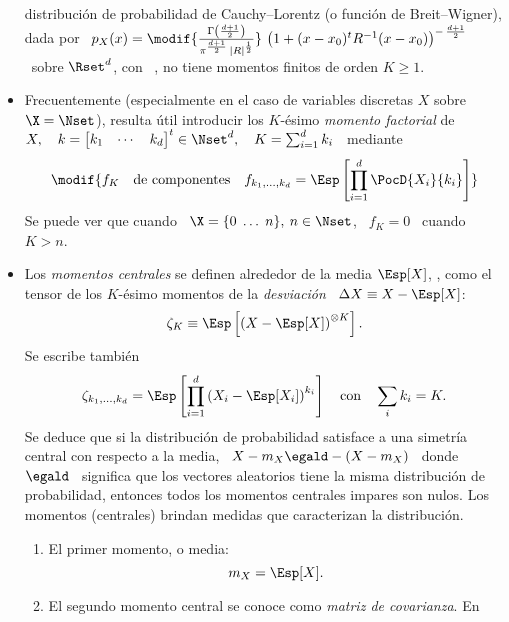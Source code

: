 \begin{itemize}
  distribuci\'on   de   probabilidad   de   Cauchy--Lorentz  (o   funci\'on   de
  Breit--Wigner), dada  por \ $p_X(x)  = \modif{\frac{\Gamma\left( \frac{d+1}{2}
      \right)}{\pi^{\frac{d+1}{2}} \, \left| R \right|^{\frac12}}} \, \left( 1 +
    (x-x_0)^t R^{-1}  (x-x_0) \right)^{-  \, \frac{d+1}{2}}$ \  sobre $\Rset^d$,
  con  \ , no  tiene momentos
  finitos de orden $K \geq 1$.
%
\item Frecuentemente (especialmente en el  caso de variables discretas $X$ sobre
  $\X  =  \Nset$),  resulta   \'util  introducir  los  $K$-\'esimo  {\it  momento
    factorial}   de   $X,  \quad   k   =   \begin{bmatrix}   k_1  &   \cdots   &
    k_d \end{bmatrix}^t \in \Nset^d, \quad K = \sum_{i=1}^d k_i$ \ mediante 
  \[
  \modif{f_K \quad  \mbox{de componentes} \quad  f_{k_1,\ldots,k_d} = \Esp\left[
      \prod_{i=1}^d \PocD{X_i}{k_i} \right]}
 \]
   Se puede
 ver que cuando \ $\X  = \{ 0 \; \ldots \; n \}, \: n \in  \Nset$, \ $f_K = 0$ \
 cuando \ $K > n$.
%
\item Los {\it  momentos centrales} se definen alrededor  de la media $\Esp[X]$,
  \ie, como  el tensor de  los $K$-\'esimo momentos  de la {\it  desviaci\'on} \
  $\Delta X \equiv X-\Esp[X]$:
  \[
  \zeta_K \equiv \Esp\left[  \left( X - \Esp[X] \right)^{\otimes K} \right].
  \]
  Se escribe tambi\'en
  \[
  \zeta_{k_1,\ldots,k_d}   =   \Esp\left[   \prod_{i=1}^d   \left(   X_i-\Esp[X_i]
    \right)^{k_i} \right] \quad \mbox{con} \quad \sum_i k_i = K.
  \]
  Se deduce que si la  distribuci\'on de probabilidad satisface a una simetr\'ia
  central  con respecto a  la media,  \ie \  $X-m_X \egald  -(X-m_X)$ \  donde \
  $\egald$ \ significa que los vectores aleatorios tiene la misma distribuci\'on
  de probabilidad, entonces todos los momentos centrales impares son nulos.  Los
  momentos     (centrales)    brindan     medidas     que    caracterizan     la
  distribuci\'on. \modif{Cuando existen:}
  \begin{enumerate}
  \item El primer momento, o media:
   \[
    m_X = \Esp[X].
   \]
 \item El segundo momento central se conoce como {\it matriz de covarianza}.  En

\end{enumerate}
\end{itemize}
